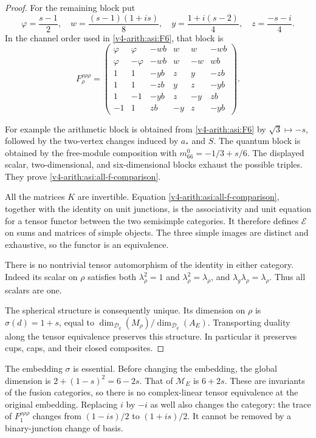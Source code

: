 \begin{proof}
For the remaining block put
\[
 \varphi=\frac{s-1}{2},\quad
 w=\frac{(s-1)(1+is)}8,\quad
 y=\frac{1+i(s-2)}4,\quad z=\frac{-s-i}{4}.
\]
In the channel order used in \eqref{v4-arith:asi:F6}, that block is
\begin{equation}\label{v4-arith:asi:e6-common-f}
 F^{\rho\rho\rho}_\rho=
 \begin{pmatrix}
 \varphi&\varphi&-wb&w&w&-wb\\
 \varphi&-\varphi&-wb&w&-w&wb\\
 1&1&-yb&z&y&-zb\\
 1&1&-zb&y&z&-yb\\
 1&-1&-yb&z&-y&zb\\
 -1&1&zb&-y&z&-yb
 \end{pmatrix}.
\end{equation}


For example the arithmetic block is obtained from
\eqref{v4-arith:asi:F6} by $\sqrt3\mapsto-s$, followed by the two-vertex
changes induced by $a_*$ and $S$. The quantum block is obtained by
the free-module composition with $m_{66}^0=-1/3+s/6$. The displayed
scalar, two-dimensional, and six-dimensional blocks exhaust the
possible triples. They prove \eqref{v4-arith:asi:all-f-comparison}.

All the matrices $K$ are invertible. Equation
\eqref{v4-arith:asi:all-f-comparison}, together with the identity on unit
junctions, is the associativity and unit equation for a tensor functor
between the two semisimple categories. It therefore defines
$\mathcal E$ on sums and matrices of simple objects. The three simple
images are distinct and exhaustive, so the functor is an equivalence.

There is no nontrivial tensor automorphism of the identity in either
category. Indeed its scalar on $\rho$ satisfies both
$\lambda_\rho^2=1$ and $\lambda_\rho^2=\lambda_\rho$, and
$\lambda_g\lambda_\rho=\lambda_\rho$. Thus all scalars are one.


The spherical structure is consequently unique. Its dimension on
$\rho$ is $\sigma(d)=1+s$, equal to
$\dim_{\mathcal D_q}(M_\rho)/\dim_{\mathcal D_q}(A_E)$.
Transporting duality along the tensor equivalence preserves this
structure. In particular it preserves cups, caps, and their closed
composites.
\end{proof}

The embedding $\sigma$ is essential. Before changing the embedding,
the global dimension is $2+(1-s)^2=6-2s$. That of $\mathcal M_E$ is
$6+2s$. These are invariants of the fusion categories, so there is no
complex-linear tensor equivalence at the original embedding. Replacing
$i$ by $-i$ as well also changes the category: the trace of
$F^{\rho\rho\rho}_1$ changes from $(1-is)/2$ to $(1+is)/2$.
It cannot be removed by a binary-junction change of basis.

